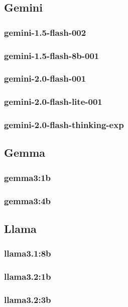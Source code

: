 \documentclass[12pt]{article}
\begin{document}
    \subsection{Gemini}
        \subsubsection{gemini-1.5-flash-002}
        \subsubsection{gemini-1.5-flash-8b-001}
        \subsubsection{gemini-2.0-flash-001}
        \subsubsection{gemini-2.0-flash-lite-001}
        \subsubsection{gemini-2.0-flash-thinking-exp}   
    \subsection{Gemma}
        \subsubsection{gemma3:1b}
        \subsubsection{gemma3:4b}   
    \subsection{Llama}
        \subsubsection{llama3.1:8b}
        \subsubsection{llama3.2:1b}
        \subsubsection{llama3.2:3b} 
    
\end{document}
